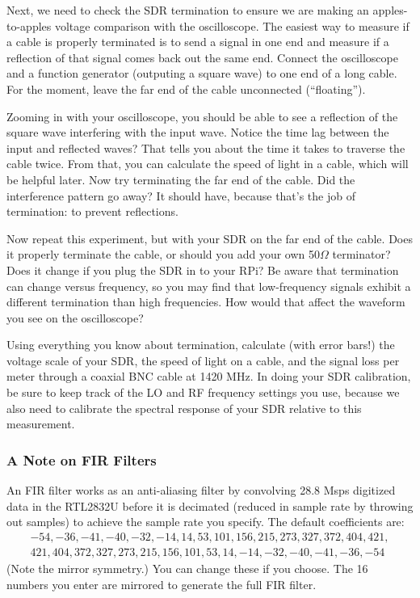\documentclass[11pt,preprint]{aastex}
\begin{document}
Next, we need to check the SDR termination to
ensure we are making an apples-to-apples voltage comparison with the
oscilloscope. The easiest way to measure if a cable is properly terminated
is to send a signal in one end and measure if a reflection of that signal
comes back out the same end. Connect
the oscilloscope and a function generator (outputing a square wave) 
to one end of a long cable. For the moment, leave the far end of the cable
unconnected (``floating'').

Zooming in with your oscilloscope, you should be able to see a reflection of the square wave
interfering with the input wave. Notice the time lag between the input and
reflected waves? That tells you about the time it takes to traverse
the cable twice. From that, you can calculate the speed of light
in a cable, which will be helpful later.
Now try terminating the far end of the cable. Did the interference pattern
go away? It should have, because that's the job of termination: to prevent
reflections.

Now repeat this experiment, but with your SDR on the far end
of the cable. Does it properly terminate the cable, or should you
add your own 50$\Omega$ terminator? Does it change if you plug the SDR
in to your RPi? Be aware that termination can change versus frequency,
so you may find that low-frequency signals exhibit a different termination
than high frequencies. How would that affect the waveform you see
on the oscilloscope?

Using everything you know about termination, calculate (with error bars!)
the voltage scale of your SDR, the speed of light on a cable, and the
signal loss per meter through a coaxial BNC cable at 1420 MHz.
In doing your SDR calibration, be sure to keep track of the LO and RF
frequency settings you use, because we also need to calibrate
the spectral response of your SDR relative to this measurement.

\subsubsection{A Note on FIR Filters}

An FIR filter works as an anti-aliasing filter by convolving
28.8 Msps digitized data in the RTL2832U before it is decimated (reduced
in sample rate by throwing out samples) to achieve the sample rate you
specify.
The default coefficients are:
$$
\begin{aligned}
   -54,-36,-41,-40,-32,-14, 14, 53, 101, 156, 215, 273, 327, 372, 404, 421, \\
   421,404,372, 327,273,215,156,101, 53, 14, -14, -32, -40, -41, -36, -54
\end{aligned}
$$ 
(Note the mirror symmetry.) You can change these if you choose.
The 16 numbers you enter are mirrored to generate the full FIR filter.
\end{document}

